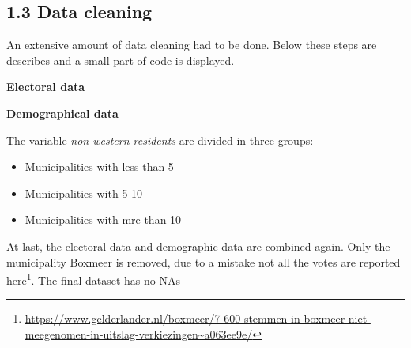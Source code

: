 \documentclass[11pt,]{article}
\newenvironment{Shaded}{\begin{snugshade}}{\end{snugshade}}
\newcommand{\KeywordTok}[1]{\textcolor[rgb]{0.13,0.29,0.53}{\textbf{#1}}}
\newcommand{\DecValTok}[1]{\textcolor[rgb]{0.00,0.00,0.81}{#1}}
\newcommand{\FloatTok}[1]{\textcolor[rgb]{0.00,0.00,0.81}{#1}}
\newcommand{\StringTok}[1]{\textcolor[rgb]{0.31,0.60,0.02}{#1}}
\newcommand{\OtherTok}[1]{\textcolor[rgb]{0.56,0.35,0.01}{#1}}
\newcommand{\OperatorTok}[1]{\textcolor[rgb]{0.81,0.36,0.00}{\textbf{#1}}}
\newcommand{\NormalTok}[1]{#1}
\let\rmarkdownfootnote\footnote%
\def\footnote{\protect\rmarkdownfootnote}
\begin{document}
\subsection{1.3 Data cleaning}\label{data-cleaning}

An extensive amount of data cleaning had to be done. Below these steps
are describes and a small part of code is displayed.

\textbf{Electoral data}

\textbf{Demographical data}

The variable \emph{non-western residents} are divided in three groups:

\begin{itemize}
\item Municipalities with less than 5 %
\item Municipalities with 5-10 %
\item Municipalities with mre than 10 %
\end{itemize}

\begin{Shaded}
\end{Shaded}

At last, the electoral data and demographic data are combined again.
Only the municipality Boxmeer is removed, due to a mistake not all the
votes are reported here\footnote{\url{https://www.gelderlander.nl/boxmeer/7-600-stemmen-in-boxmeer-niet-meegenomen-in-uitslag-verkiezingen~a063ee9e/}}.
The final dataset has no NAs
\end{document}
